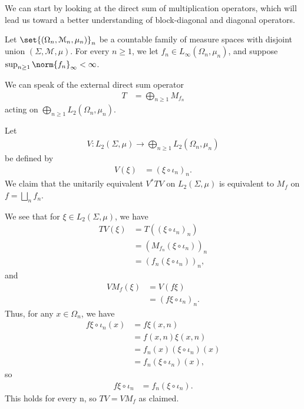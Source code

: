 \documentclass[10pt]{mypackage}
\begin{document}
We can start by looking at the direct sum of multiplication operators, which will lead us toward a better understanding of block-diagonal and diagonal operators.
\begin{example}
  Let $\set{\left(\Omega_n,\mathcal{M}_n,\mu_n\right)}_n$ be a countable family of measure spaces with disjoint union $\left(\Sigma,\mathcal{M},\mu\right)$. For every $n\geq 1$, we let $f_n\in L_{\infty}\left(\Omega_n,\mu_n\right)$, and suppose $\sup_{n\geq 1}\norm{f_n}_{\infty} < \infty$.\newline

  We can speak of the external direct sum operator
  \begin{align*}
    T &= \bigoplus_{n\geq 1}M_{f_n}
  \end{align*}
  acting on $\bigoplus_{n\geq 1}L_2\left(\Omega_n,\mu_n\right)$.\newline

  Let
  \begin{align*}
    V: L_2\left(\Sigma,\mu\right) \rightarrow \bigoplus_{n\geq 1}L_2\left(\Omega_n,\mu_n\right)
  \end{align*}
  be defined by
  \begin{align*}
    V\left(\xi\right) &= \left(\xi\circ \iota_n\right)_n.
  \end{align*}
  We claim that the unitarily equivalent $V^{\ast}TV$ on $L_2\left(\Sigma,\mu\right)$ is equivalent to $M_f$ on $f = \bigsqcup_{n}f_n$.\newline

  We see that for $\xi\in L_2\left(\Sigma,\mu\right)$, we have
  \begin{align*}
    TV\left(\xi\right) &= T\left(\left(\xi\circ \iota_n\right)_n\right)\\
                       &= \left(M_{f_n}\left(\xi\circ \iota_n\right)\right)_n\\
                       &= \left(f_n\left(\xi\circ \iota_n\right)\right)_n,
  \end{align*}
  and
  \begin{align*}
    VM_f\left(\xi\right) &= V\left(f\xi\right)\\
                         &= \left(f\xi\circ \iota_n\right)_n.
  \end{align*}
  Thus, for any $x\in \Omega_n$, we have
  \begin{align*}
    f\xi\circ \iota_n\left(x\right) &= f\xi \left(x,n\right)\\
                                    &= f\left(x,n\right)\xi\left(x,n\right)\\
                                    &= f_n\left(x\right)\left(\xi\circ \iota_n\right)(x)\\
                                    &= f_n\left(\xi\circ \iota_n\right)\left(x\right),
  \end{align*}
  so
  \begin{align*}
    f\xi\circ \iota_n &= f_n\left(\xi\circ \iota_n\right).
  \end{align*}
  This holds for every n, so $TV = VM_f$ as claimed.
\end{example}
\end{document}
